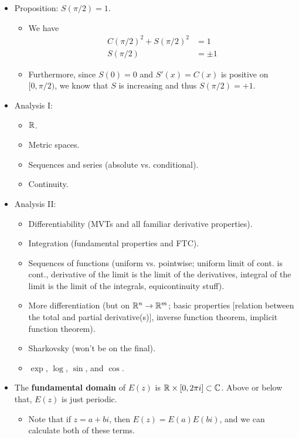 \documentclass[../notes.tex]{subfiles}
\begin{document}
\begin{itemize}
\begin{itemize}
    \end{itemize}
    \item Proposition: $S(\pi/2)=1$.
    \begin{itemize}
        \item We have
        \begin{align*}
            C(\pi/2)^2+S(\pi/2)^2 &= 1\\
            S(\pi/2) &= \pm 1
        \end{align*}
        \item Furthermore, since $S(0)=0$ and $S'(x)=C(x)$ is positive on $[0,\pi/2)$, we know that $S$ is increasing and thus $S(\pi/2)=+1$.
    \end{itemize}
    \item {}Analysis I:
    \begin{itemize}
        \item $\mathbb{R}$.
        \item Metric spaces.
        \item Sequences and series (absolute vs. conditional).
        \item Continuity.
    \end{itemize}
    \item Analysis II:
    \begin{itemize}
        \item Differentiability (MVTs and all familiar derivative properties).
        \item Integration (fundamental properties and FTC).
        \item Sequences of functions (uniform vs. pointwise; uniform limit of cont. is cont., derivative of the limit is the limit of the derivatives, integral of the limit is the limit of the integrals, equicontinuity stuff).
        \item More differentiation (but on $\mathbb{R}^n\to\mathbb{R}^m$; basic properties [relation between the total and partial derivative(s)], inverse function theorem, implicit function theorem).
        \item Sharkovsky (won't be on the final).
        \item $\exp$, $\log$, $\sin$, and $\cos$.
    \end{itemize}
    \item The \textbf{fundamental domain} of $E(z)$ is $\mathbb{R}\times[0,2\pi i]\subset\mathbb{C}$. Above or below that, $E(z)$ is just periodic.
    \begin{itemize}
        \item Note that if $z=a+bi$, then $E(z)=E(a)E(bi)$, and we can calculate both of these terms.

\end{itemize}
\end{itemize}
\end{document}
